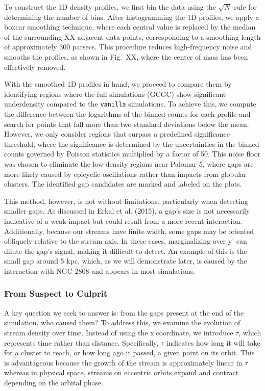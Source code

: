 \documentclass[draft]{aa}
\begin{document}
      To construct the 1D density profiles, we first bin the data using the  $\sqrt{N}$-rule for determining the number of bins. After histogramming the 1D profiles, we apply a boxcar smoothing technique, where each central value is replaced by the median of the surrounding XX adjacent data points, corresponding to a smoothing length of approximately 300 parsecs. This procedure reduces high-frequency noise and smooths the profiles, as shown in Fig.~XX, where the center of mass has been effectively removed.

      With the smoothed 1D profiles in hand, we proceed to compare them by identifying regions where the full simulations (GCGC) show significant underdensity compared to the \texttt{vanilla} simulations. To achieve this, we compute the difference between the logarithms of the binned counts for each profile and search for points that fall more than two standard deviations below the mean. However, we only consider regions that surpass a predefined significance threshold, where the significance is determined by the uncertainties in the binned counts governed by Poisson statistics multiplied by a factor of 50. This noise floor was chosen to eliminate the low-density regions near Palomar 5, where gaps are more likely caused by epicyclic oscillations rather than impacts from globular clusters. The identified gap candidates are marked and labeled on the plots.

      This method, however, is not without limitations, particularly when detecting smaller gaps. As discussed in Erkal et al. (2015), a gap's size is not necessarily indicative of a weak impact but could result from a more recent interaction. Additionally, because our streams have finite width, some gaps may be oriented obliquely relative to the stream axis. In these cases, marginalizing over y' can dilute the gap's signal, making it difficult to detect. An example of this is the small gap around 5 kpc, which, as we will demonstrate later, is caused by the interaction with NGC 2808 and appears in most simulations. 


    \subsubsection*{From Suspect to Culprit} \label{SuspectToCulprit}

      A key question we seek to answer is: from the gaps present at the end of the simulation, who caused them? To address this, we examine the evolution of stream density over time. Instead of using the x'coordinate, we introduce $\tau$, which represents time rather than distance. Specifically, $\tau$ indicates how long it will take for a cluster to reach, or how long ago it passed, a given point on its orbit. This is advantageous because the growth of the stream is approximately linear in $\tau$ whereas in physical space, streams on eccentric orbits expand and contract depending on the orbital phase.
\end{document}
